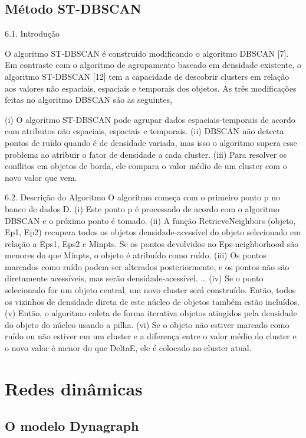 \subsection{Método ST-DBSCAN}

6.1. Introdução

O algoritmo ST-DBSCAN é construído modificando o algoritmo DBSCAN [7]. Em contraste com o algoritmo de agrupamento baseado em densidade existente, o algoritmo ST-DBSCAN [12] tem a capacidade de descobrir clusters em relação aos valores não espaciais, espaciais e temporais dos objetos. As três modificações feitas no algoritmo DBSCAN são as seguintes,

(i) O algoritmo ST-DBSCAN pode agrupar dados espaciais-temporais de acordo com atributos não espaciais, espaciais e temporais.
(ii) DBSCAN não detecta pontos de ruído quando é de densidade variada, mas isso o algoritmo supera esse problema ao atribuir o fator de densidade a cada cluster.
(iii) Para resolver os conflitos em objetos de borda, ele compara o valor médio de um cluster com o novo valor que vem.

6.2. Descrição do Algoritmo
O algoritmo começa com o primeiro ponto p no banco de dados D.
(i) Este ponto p é processado de acordo com o algoritmo DBSCAN e o próximo ponto é tomado.
(ii) A função RetrieveNeighbors (objeto, Ep1, Ep2) recupera todos os objetos densidade-acessível do objeto selecionado em relação a Eps1, Eps2 e Minpts. Se os pontos devolvidos no Eps-neighborhood são menores do que Minpts, o objeto é atribuído como ruído.
(iii) Os pontos marcados como ruído podem ser alterados posteriormente, e os pontos não são diretamente acessíveis, mas serão densidade-acessível.
…
(iv) Se o ponto selecionado for um objeto central, um novo cluster será construído. Então, todos os vizinhos de densidade direta de este núcleo de objetos também estão incluídos.
(v) Então, o algoritmo coleta de forma iterativa objetos atingidos pela densidade do objeto do núcleo usando a pilha.
(vi) Se o objeto não estiver marcado como ruído ou não estiver em um cluster e a diferença
entre o valor médio do cluster e o novo valor é menor do que DeltaE, ele é colocado no cluster atual.

\section{Redes dinâmicas}
\subsection{O modelo Dynagraph}
